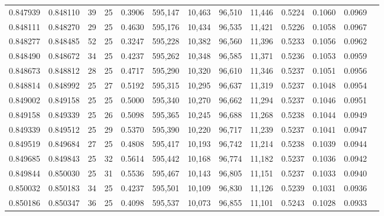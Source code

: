 \begin{tabular}{rrrrrrrrrrrrr}
0.847939 & 0.848110 &    39 &  25 &                                     0.3906 & 595,147 &  10,463 &  96,510 &  11,446 & 0.5224 & 0.1060 & 0.0969 \\
0.848111 & 0.848270 &    29 &  25 &                                     0.4630 & 595,176 &  10,434 &  96,535 &  11,421 & 0.5226 & 0.1058 & 0.0967 \\
0.848277 & 0.848485 &    52 &  25 &                                     0.3247 & 595,228 &  10,382 &  96,560 &  11,396 & 0.5233 & 0.1056 & 0.0962 \\
0.848490 & 0.848672 &    34 &  25 &                                     0.4237 & 595,262 &  10,348 &  96,585 &  11,371 & 0.5236 & 0.1053 & 0.0959 \\
0.848673 & 0.848812 &    28 &  25 &                                     0.4717 & 595,290 &  10,320 &  96,610 &  11,346 & 0.5237 & 0.1051 & 0.0956 \\
0.848814 & 0.848992 &    25 &  27 &                                     0.5192 & 595,315 &  10,295 &  96,637 &  11,319 & 0.5237 & 0.1048 & 0.0954 \\
0.849002 & 0.849158 &    25 &  25 &                                     0.5000 & 595,340 &  10,270 &  96,662 &  11,294 & 0.5237 & 0.1046 & 0.0951 \\
0.849158 & 0.849339 &    25 &  26 &                                     0.5098 & 595,365 &  10,245 &  96,688 &  11,268 & 0.5238 & 0.1044 & 0.0949 \\
0.849339 & 0.849512 &    25 &  29 &                                     0.5370 & 595,390 &  10,220 &  96,717 &  11,239 & 0.5237 & 0.1041 & 0.0947 \\
0.849519 & 0.849684 &    27 &  25 &                                     0.4808 & 595,417 &  10,193 &  96,742 &  11,214 & 0.5238 & 0.1039 & 0.0944 \\
0.849685 & 0.849843 &    25 &  32 &                                     0.5614 & 595,442 &  10,168 &  96,774 &  11,182 & 0.5237 & 0.1036 & 0.0942 \\
0.849844 & 0.850030 &    25 &  31 &                                     0.5536 & 595,467 &  10,143 &  96,805 &  11,151 & 0.5237 & 0.1033 & 0.0940 \\
0.850032 & 0.850183 &    34 &  25 &                                     0.4237 & 595,501 &  10,109 &  96,830 &  11,126 & 0.5239 & 0.1031 & 0.0936 \\
0.850186 & 0.850347 &    36 &  25 &                                     0.4098 & 595,537 &  10,073 &  96,855 &  11,101 & 0.5243 & 0.1028 & 0.0933 \\

\end{tabular}
